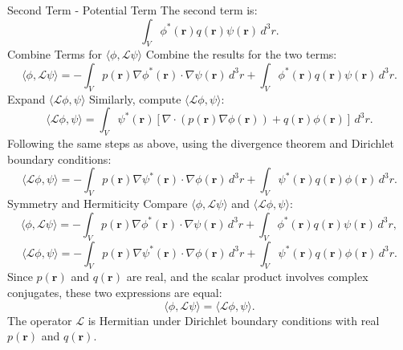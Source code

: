 \documentclass[12pt]{article}
\begin{document}
        Second Term - Potential Term
        The second term is:
        \[
        \int_V \phi^*(\mathbf{r}) q(\mathbf{r}) \psi(\mathbf{r}) \, d^3r.
        \]
        Combine Terms for \(\langle \phi, \mathcal{L}\psi \rangle\)
        Combine the results for the two terms:
        \[
        \langle \phi, \mathcal{L}\psi \rangle = -\int_V p(\mathbf{r}) \nabla \phi^*(\mathbf{r}) \cdot \nabla \psi(\mathbf{r}) \, d^3r + \int_V \phi^*(\mathbf{r}) q(\mathbf{r}) \psi(\mathbf{r}) \, d^3r.
        \]
        Expand \(\langle \mathcal{L}\phi, \psi \rangle\)
        Similarly, compute \(\langle \mathcal{L}\phi, \psi \rangle\):
        \[
        \langle \mathcal{L}\phi, \psi \rangle = \int_V \psi^*(\mathbf{r}) \left[ \nabla \cdot \left( p(\mathbf{r}) \nabla \phi(\mathbf{r}) \right) + q(\mathbf{r}) \phi(\mathbf{r}) \right] \, d^3r.
        \]
        Following the same steps as above, using the divergence theorem and Dirichlet boundary conditions:
        \[
        \langle \mathcal{L}\phi, \psi \rangle = -\int_V p(\mathbf{r}) \nabla \psi^*(\mathbf{r}) \cdot \nabla \phi(\mathbf{r}) \, d^3r + \int_V \psi^*(\mathbf{r}) q(\mathbf{r}) \phi(\mathbf{r}) \, d^3r.
        \]
        Symmetry and Hermiticity
        Compare \(\langle \phi, \mathcal{L}\psi \rangle\) and \(\langle \mathcal{L}\phi, \psi \rangle\):
        \[
        \langle \phi, \mathcal{L}\psi \rangle = -\int_V p(\mathbf{r}) \nabla \phi^*(\mathbf{r}) \cdot \nabla \psi(\mathbf{r}) \, d^3r + \int_V \phi^*(\mathbf{r}) q(\mathbf{r}) \psi(\mathbf{r}) \, d^3r,
        \]
        \[
        \langle \mathcal{L}\phi, \psi \rangle = -\int_V p(\mathbf{r}) \nabla \psi^*(\mathbf{r}) \cdot \nabla \phi(\mathbf{r}) \, d^3r + \int_V \psi^*(\mathbf{r}) q(\mathbf{r}) \phi(\mathbf{r}) \, d^3r.
        \]
        Since \(p(\mathbf{r})\) and \(q(\mathbf{r})\) are real, and the scalar product involves complex conjugates, these two expressions are equal:
        \[
        \langle \phi, \mathcal{L}\psi \rangle = \langle \mathcal{L}\phi, \psi \rangle.
        \]
        The operator \(\mathcal{L}\) is Hermitian under Dirichlet boundary conditions with real \(p(\mathbf{r})\) and \(q(\mathbf{r})\).
\end{document}
